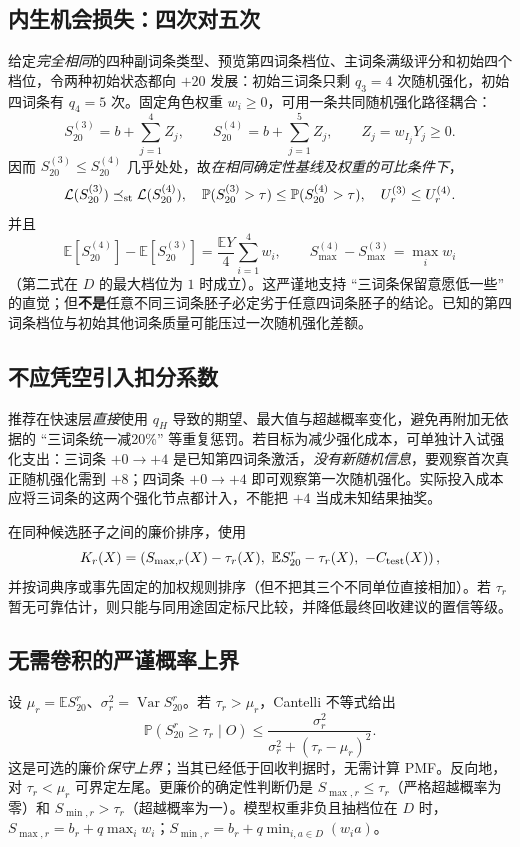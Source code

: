 \documentclass[11pt,a4paper]{ctexart}
\newcommand{\Law}{\mathcal L}
\newcommand{\Var}{\operatorname{Var}}
\newcommand{\E}{\mathbb E}
\newcommand{\Prob}{\mathbb P}
\begin{document}
\subsection{内生机会损失：四次对五次}
给定\emph{完全相同}的四种副词条类型、预览第四词条档位、主词条满级评分和初始四个档位，令两种初始状态都向 $+20$ 发展：初始三词条只剩 $q_3=4$ 次随机强化，初始四词条有 $q_4=5$ 次。固定角色权重 $w_i\ge0$，可用一条共同随机强化路径耦合：
\[
S_{20}^{(3)}=b+\sum_{j=1}^4Z_j,\qquad
S_{20}^{(4)}=b+\sum_{j=1}^5Z_j,
\qquad Z_j=w_{I_j}Y_j\ge0.
\]
因而 $S_{20}^{(3)}\le S_{20}^{(4)}$ 几乎处处，故\emph{在相同确定性基线及权重的可比条件下}，
\begin{equation}\label{eq:three-dominance}
\Law(S_{20}^{(3)})\preceq_{\rm st}\Law(S_{20}^{(4)}),\quad
\Prob(S_{20}^{(3)}>\tau)\le \Prob(S_{20}^{(4)}>\tau),\quad
U_r^{(3)}\le U_r^{(4)}.
\end{equation}
并且
\[
\E[S_{20}^{(4)}]-\E[S_{20}^{(3)}]
=\frac{\E Y}{4}\sum_{i=1}^4w_i,
\qquad
S_{\max}^{(4)}-S_{\max}^{(3)}=\max_iw_i
\]
（第二式在 $D$ 的最大档位为 $1$ 时成立）。这严谨地支持 ``三词条保留意愿低一些'' 的直觉；但\textbf{不是}任意不同三词条胚子必定劣于任意四词条胚子的结论。已知的第四词条档位与初始其他词条质量可能压过一次随机强化差额。

\subsection{不应凭空引入扣分系数}
推荐在快速层\emph{直接}使用 $q_H$ 导致的期望、最大值与超越概率变化，避免再附加无依据的 ``三词条统一减20\%'' 等重复惩罚。若目标为减少强化成本，可单独计入试强化支出：三词条 $+0\to+4$ 是已知第四词条激活，\emph{没有新随机信息}，要观察首次真正随机强化需到 $+8$；四词条 $+0\to+4$ 即可观察第一次随机强化。实际投入成本应将三词条的这两个强化节点都计入，不能把 $+4$ 当成未知结果抽奖。

在同种候选胚子之间的廉价排序，使用
\[
K_r(X)=\left(S_{\max,r}(X)-\tau_r(X),\ \E S_{20}^r-\tau_r(X),\ -C_{\rm test}(X)\right),
\]
并按词典序或事先固定的加权规则排序（但不把其三个不同单位直接相加）。若 $\tau_r$ 暂无可靠估计，则只能与同用途固定标尺比较，并降低最终回收建议的置信等级。

\subsection{无需卷积的严谨概率上界}
设 $\mu_r=\E S_{20}^r$、$\sigma_r^2=\Var S_{20}^r$。若 $\tau_r>\mu_r$，Cantelli 不等式给出
\begin{equation}\label{eq:cantelli}
\Prob(S_{20}^r\ge\tau_r\mid O)\le
\frac{\sigma_r^2}{\sigma_r^2+(\tau_r-\mu_r)^2}.
\end{equation}
这是可选的廉价\emph{保守上界}；当其已经低于回收判据时，无需计算 PMF。反向地，对 $\tau_r<\mu_r$ 可界定左尾。更廉价的确定性判断仍是 $S_{\max,r}\le\tau_r$（严格超越概率为零）和 $S_{\min,r}>\tau_r$（超越概率为一）。模型权重非负且抽档位在 $D$ 时，$S_{\max,r}=b_r+q\max_iw_i$；$S_{\min,r}=b_r+q\min_{i,a\in D}(w_i a)$。
\end{document}

